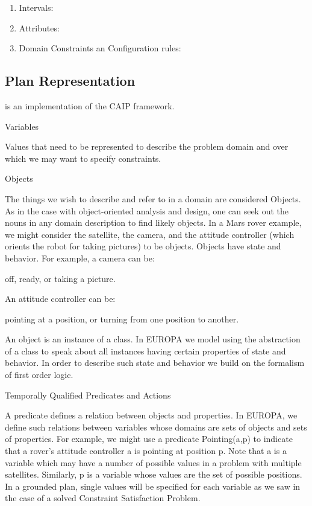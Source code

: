 \begin{enumerate}
	\item Intervals: 
	\item Attributes:
	\item Domain Constraints an Configuration rules:
\end{enumerate}


\subsection{\eu Plan Representation}
\label{sec:europa:pr}

\eu is an implementation of the CAIP framework.


Variables

Values that need to be represented to describe the problem domain and over which we may want to specify constraints.

Objects

The things we wish to describe and refer to in a domain are considered
Objects. As in the case with object-oriented analysis and design, one
can seek out the nouns in any domain description to find likely
objects. In a Mars rover example, we might consider the satellite, the
camera, and the attitude controller (which orients the robot for
taking pictures) to be objects. Objects have state and behavior. For
example, a camera can be:

    off,
    ready, or
    taking a picture. 

An attitude controller can be:

    pointing at a position, or
    turning from one position to another. 

    An object is an instance of a class. In EUROPA we model using the
    abstraction of a class to speak about all instances having certain
    properties of state and behavior. In order to describe such state
    and behavior we build on the formalism of first order logic.


Temporally Qualified Predicates and Actions

A predicate defines a relation between objects and properties. In
EUROPA, we define such relations between variables whose domains are
sets of objects and sets of properties. For example, we might use a
predicate Pointing(a,p) to indicate that a rover's attitude controller
a is pointing at position p. Note that a is a variable which may have
a number of possible values in a problem with multiple
satellites. Similarly, p is a variable whose values are the set of
possible positions. In a grounded plan, single values will be
specified for each variable as we saw in the case of a solved
Constraint Satisfaction Problem.

